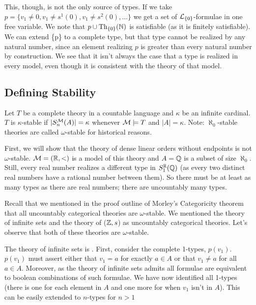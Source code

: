 This, though, is not the only source of types. 
If we take \(p = \{v_1 \neq 0, v_1 \neq s^1(0), v_1 \neq s^2(0), \ldots\}\) we get a set of \(\mathcal{L}_{\{0\}}\)-formulae in one free variable. 
We note that \(p \cup \text{Th}_{\{0\}}(\mathbb{N})\) is satisfiable (as it is finitely satisfiable). 
We can extend \{p\} to a complete type, but that type cannot be realized by any natural number, since an element realizing \(p\) is greater than every natural number by construction. 
We see that it isn't always the case that a type is realized in every model, even though it is consistent with the theory of that model. 

\subsection{Defining Stability}

\begin{definition}\label{def_stability}
Let \(T\) be a complete theory in a countable language and \(\kappa\) be an infinite cardinal. 
\(T\) is \(\kappa\)-stable if \(|S_n^{\mathcal{M}}(A)| = \kappa\) whenever \(\mathcal{M} \models T\) and \(|A| = \kappa\). 
Note: \(\aleph_0\)-stable theories are called \(\omega\)-stable for historical reasons. 
\end{definition}

First, we will show that the theory of dense linear orders without endpoints is not \(\omega\)-stable. 
\(\mathcal{M} = (\mathbb{R}, <)\) is a model of this theory and \(A = \mathbb{Q}\) is a subset of size \(\aleph_0\). 
Still, every real number realizes a different type in \(S_1^{\mathbb{R}}(\mathbb{Q})\) (as every two distinct real numbers have a rational number between them). 
So there must be at least as many types as there are real numbers; there are uncountably many types.  

Recall that we mentioned in the proof outline of Morley's Categoricity theorem that all uncountably categorical theories are \(\omega\)-stable. 
We mentioned the theory of infinite sets and the theory of (\(\mathbb{Z}, s\)) as uncountably categorical theories. 
Let's observe that both of these theories are \(\omega\)-stable. 

\begin{example}\label{example_omst_sets}
The theory of infinite sets is \omst. 
First, consider the complete 1-types, \(p(v_1)\). \(p(v_1)\) must assert either that \(v_1 = a\) for exactly \(a \in A\) or that \(v_1 \neq a\) for all \(a \in A\). 
Moreover, as the theory of infinite sets admits \qe all formulae are equivalent to boolean combinations of such formulae. %
We have now identified all 1-types (there is one for each element in \(A\) and one more for when \(v_1\) isn't in \(A\)). 
This can be easily extended to \(n\)-types for \(n > 1\)
\end{example}

